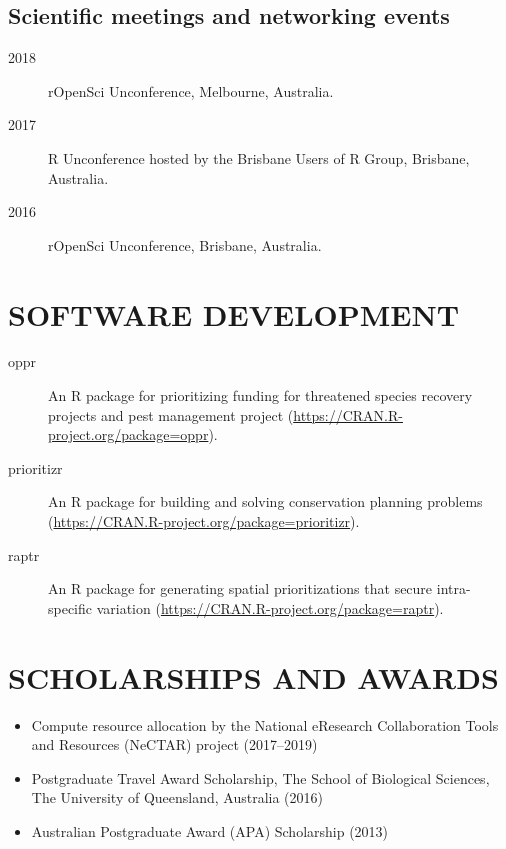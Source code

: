 \documentclass[12pt,a4paper]{article}
\begin{document}
\subsection*{Scientific meetings and networking events}
\begin{description}

\item [2018] rOpenSci Unconference, Melbourne, Australia.

\item[2017] R Unconference hosted by the Brisbane Users of R Group, Brisbane, Australia.

\item[2016] rOpenSci Unconference, Brisbane, Australia.
\end{description}

\section*{SOFTWARE DEVELOPMENT}
\begin{description}

\item[oppr] An R package for prioritizing funding for threatened species recovery projects and pest management project (\url{https://CRAN.R-project.org/package=oppr}).

\item[prioritizr] An R package for building and solving conservation planning problems (\url{https://CRAN.R-project.org/package=prioritizr}).

\item[raptr] An R package for generating spatial prioritizations that secure intra-specific variation (\url{https://CRAN.R-project.org/package=raptr}).

\end{description}

\section*{SCHOLARSHIPS AND AWARDS}
\begin{itemize}

\item Compute resource allocation by the National eResearch Collaboration Tools and Resources (NeCTAR) project (2017--2019)

\item Postgraduate Travel Award Scholarship, The School of Biological Sciences, The University of Queensland, Australia (2016)

\item Australian Postgraduate Award (APA) Scholarship (2013)

\end{itemize}
\end{document}
